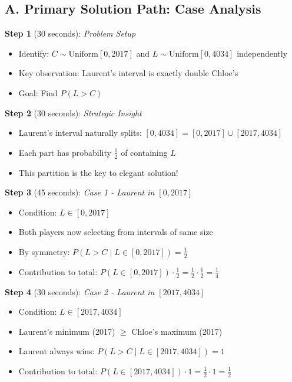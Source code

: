 \documentclass[]{article}
\begin{document}
\begin{solutionbox}
\subsection*{A. Primary Solution Path: Case Analysis}

\textbf{Step 1} (30 seconds): \textit{Problem Setup}
\begin{itemize}[leftmargin=*]
    \item Identify: $C \sim \text{Uniform}[0, 2017]$ and $L \sim \text{Uniform}[0, 4034]$ independently
    \item Key observation: Laurent's interval is exactly double Chloe's
    \item Goal: Find $P(L > C)$
\end{itemize}

\textbf{Step 2} (30 seconds): \textit{Strategic Insight}
\begin{itemize}[leftmargin=*]
    \item Laurent's interval naturally splits: $[0, 4034] = [0, 2017] \cup [2017, 4034]$
    \item Each part has probability $\frac{1}{2}$ of containing $L$
    \item This partition is the key to elegant solution!
\end{itemize}

\textbf{Step 3} (45 seconds): \textit{Case 1 - Laurent in $[0, 2017]$}
\begin{itemize}[leftmargin=*]
    \item Condition: $L \in [0, 2017]$
    \item Both players now selecting from intervals of same size
    \item By symmetry: $P(L > C \mid L \in [0, 2017]) = \frac{1}{2}$
    \item Contribution to total: $P(L \in [0,2017]) \cdot \frac{1}{2} = \frac{1}{2} \cdot \frac{1}{2} = \frac{1}{4}$
\end{itemize}

\textbf{Step 4} (30 seconds): \textit{Case 2 - Laurent in $[2017, 4034]$}
\begin{itemize}[leftmargin=*]
    \item Condition: $L \in [2017, 4034]$
    \item Laurent's minimum (2017) $\geq$ Chloe's maximum (2017)
    \item Laurent always wins: $P(L > C \mid L \in [2017, 4034]) = 1$
    \item Contribution to total: $P(L \in [2017,4034]) \cdot 1 = \frac{1}{2} \cdot 1 = \frac{1}{2}$
\end{itemize}


\end{solutionbox}
\end{document}
